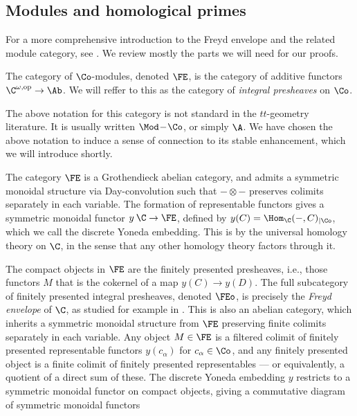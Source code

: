 \subsection{Modules and homological primes}

For a more comprehensive introduction to the Freyd envelope and the related module category, see \cite[Appendix A.]{balmer_krause_stevenson_2020}. We review mostly the parts we will need for our proofs. 

\begin{definition}
    The category of $\Co$-modules, denoted $\FE$, is the category of additive functors $\C^{\omega, \mathrm{op}} \to \Ab$. We will reffer to this as the category of \emph{integral presheaves} on $\Co$. 
\end{definition}

\begin{remark}
    The above notation for this category is not standard in the $tt$-geometry literature. It is usually written $\Mod\!-\!\Co$, or simply $\A$. We have chosen the above notation to induce a sense of connection to its stable enhancement, which we will introduce shortly. 
\end{remark}

The category $\FE$ is a Grothendieck abelian category, and admits a symmetric monoidal structure via Day-convolution such that $-\otimes -$ preserves colimits separately in each variable. The formation of representable functors gives a symmetric monoidal functor $y\: \C \to \FE$, defined by $y(C) = \Hom_\C(-, C)_{\mid \Co}$, which we call the discrete Yoneda embedding. This is by \cite[2.4]{krause_2000} the universal homology theory on $\C$, in the sense that any other homology theory factors through it. 

The compact objects in $\FE$ are the finitely presented presheaves, i.e., those functors $M$ that is the cokernel of a map $y(C)\to y(D)$. The full subcategory of finitely presented integral presheaves, denoted $\FEo$, is precisely the \emph{Freyd envelope} of $\C$, as studied for example in \cite[Chapter 5]{neeman_2014}. This is also an abelian category, which inherits a symmetric monoidal structure from $\FE$ preserving finite colimits separately in each variable. Any object $M\in \FE$ is a filtered colimit of finitely presented representable functors $y(c_\alpha)$ for $c_\alpha \in \Co$, and any finitely presented object is a finite colimit of finitely presented representables --- or equivalently, a quotient of a direct sum of these. The discrete Yoneda embedding $y$ restricts to a symmetric monoidal functor on compact objects, giving a commutative diagram of symmetric monoidal functors

